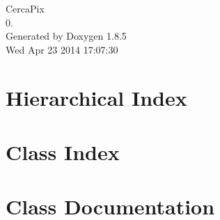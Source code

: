 \documentclass[twoside]{book}
\newcommand{\clearemptydoublepage}{%
  \newpage{\pagestyle{empty}\cleardoublepage}%
}
\begin{document}
\hypersetup{pageanchor=false}
\begin{titlepage}
\vspace*{7cm}
\begin{center}%
{\Large Cerca\-Pix \\[1ex]\large 0. }\\
\vspace*{1cm}
{\large Generated by Doxygen 1.8.5}\\
\vspace*{0.5cm}
{\small Wed Apr 23 2014 17:07:30}\\
\end{center}
\end{titlepage}
\clearemptydoublepage
\tableofcontents
\clearemptydoublepage
{}
\hypersetup{pageanchor=true}

\chapter{Hierarchical Index}

\chapter{Class Index}

\chapter{Class Documentation}
































\newpage
{}
{}
\printindex
\end{document}
